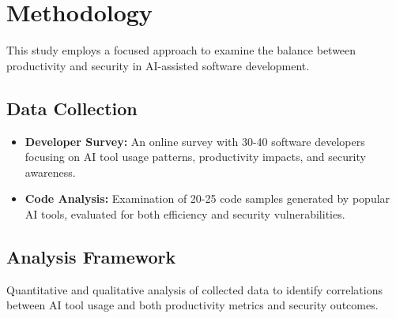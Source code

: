 \section{Methodology}
This study employs a focused approach to examine the balance between productivity and security in AI-assisted software development.

\subsection{Data Collection}
\begin{itemize}
    \item \textbf{Developer Survey:}  
    An online survey with 30-40 software developers focusing on AI tool usage patterns, productivity impacts, and security awareness.
    
    \item \textbf{Code Analysis:}  
    Examination of 20-25 code samples generated by popular AI tools, evaluated for both efficiency and security vulnerabilities.
\end{itemize}

\subsection{Analysis Framework}
Quantitative and qualitative analysis of collected data to identify correlations between AI tool usage and both productivity metrics and security outcomes.
